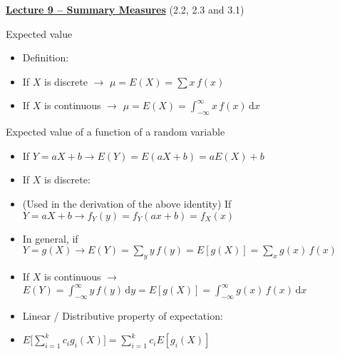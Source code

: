 \documentclass{article}
\newcommand{\bu}[1]{\textbf{\ul{#1}}}				%
\newcommand{\integral}[4]{\displaystyle \int_{#1}^{#2} #3 \,\mathrm{d} #4}		%
\begin{document}
%

{\large \bu{Lecture 9 -- Summary Measures}} (2.2, 2.3 and 3.1)\bigskip

Expected value
\begin{itemize}
    \item Definition:
    \item[] If $X$ is discrete $\rightarrow$ $\mu = E(X) = \displaystyle \sum x \, f(x)$
    \item[] If $X$ is continuous $\rightarrow$ $\mu = E(X) = \integral{-\infty}{\infty}{x \, f(x)}{x}$
\end{itemize}\bigskip

Expected value of a function of a random variable
\begin{itemize}
    \item If $Y = aX + b \rightarrow E(Y) = E(aX + b) = a E(X) + b$
    \item If $X$ is discrete:
    \item[] (Used in the derivation of the above identity) If $Y = aX + b \rightarrow f_Y(y) = f_Y(ax + b) = f_X(x)$ 
    \item[] In general, if $Y = g(X) \rightarrow \displaystyle E(Y) = \sum_y y \, f(y) = E[g(X)] = \sum_x g(x) \, f(x)$
    \item If $X$ is continuous $\rightarrow$ $E(Y) = \integral{-\infty}{\infty}{y \, f(y)}{y} = E[g(X)] = \integral{-\infty}{\infty}{g(x) \, f(x)}{x}$
    \item Linear / Distributive property of expectation:
    \item[] $\displaystyle E\bigg[\sum_{i = 1}^k c_i g_i(X)\bigg] = \sum_{i = 1}^k c_i E[g_i(X)]$
\end{itemize}\bigskip
\end{document}
